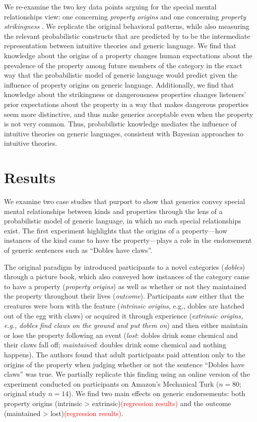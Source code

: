 \documentclass[floatsintext, 11pt, doc]{apa6}
\newcommand{\red}[1]{\textcolor{Red}{#1}}
\begin{document}
We re-examine the two key data points arguing for the special mental relationships view: one concerning \emph{property origins} \cite{Gelman2007} and one concerning \emph{property strikingness} \cite{Cimpian2010}.%
We replicate the original behavioral patterns, while also measuring the relevant probabilistic constructs that are predicted by  to be the intermediate representation between intuitive theories and generic language. 
We find that knowledge about the origins of a property changes human expectations about the prevalence of the property among future members of the category in the exact way that the probabilistic model of generic language would predict given the influence of property origins on generic language.
Additionally, we find that knowledge about the strikingness or dangerousness properties changes listeners' prior expectations about the property in a way that makes dangerous properties seem more distinctive, and thus make generics acceptable even when the property is not very common.
Thus, probabilistic knowledge mediates the influence of intuitive theories on generic languages, consistent with Bayesian approaches to intuitive theories. 


\section{Results}

We examine two case studies that purport to show that generics convey special mental relationships between kinds and properties through the lens of a probabilistic model of generic language, in which no such special relationships exist. 
The first experiment highlights that the origins of a property---how instances of the kind came to have the property---plays a role in the endorsement of generic sentences such as ``Dobles have claws''.

The original paradigm by  introduced participants to a novel categories (\emph{dobles}) through a picture book, which also conveyed how instances of the category came to have a property (\emph{property origins}) as well as whether or not they maintained the property throughout their lives (\emph{outcome}).
Participants saw either that the creatures were born with the feature (\emph{intrinsic origins}, e.g., dobles are hatched out of the egg with claws) or acquired it through experience (\emph{extrinsic origins, e.g., dobles find claws on the ground and put them on}) and then either maintain or lose the property following an event (\emph{lost}: dobles drink some chemical and their claws fall off; \emph{maintained}: doubles drink some chemical and nothing happens). 
The authors found that adult participants paid attention only to the origins of the property when judging whether or not the sentence ``Dobles have claws'' was true.
We partially replicate this finding using an online version of the experiment conducted on participants on Amazon's Mechanical Turk ($n=80$; original study $n=14$). 
We find two main effects on generic endorsements: both property origins (intrinsic > extrinsic)\red{(regression results)} and the outcome (maintained > lost)\red{(regression results)}. 
\end{document}
